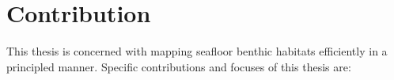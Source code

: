 %		
%		
%		
		
	\section{Contribution}
	
		This thesis is concerned with mapping seafloor benthic habitats efficiently in a principled manner. Specific contributions and focuses of this thesis are:
		
